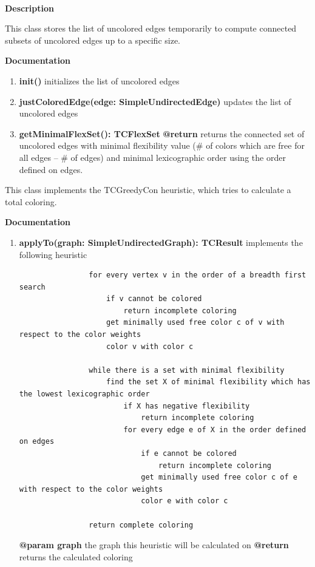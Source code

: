 	~\newpage
	
	
	\textbf{Description}
	
	This class stores the list of uncolored edges temporarily to compute connected subsets of uncolored edges up to a specific size.
		
	\textbf{Documentation}
	
	\begin{enumerate}[\#]
		\item{
			\textbf{init()} \newline
			initializes the list of uncolored edges
		}
		\item{
			\textbf{justColoredEdge(edge: SimpleUndirectedEdge)} \newline
			updates the list of uncolored edges
		}
		\item{
			\textbf{getMinimalFlexSet(): TCFlexSet} \newline
			\textbf{@return} returns the connected set of uncolored edges with minimal flexibility value (\# of colors which are free for all edges -- \# of edges) and minimal lexicographic order using the order defined on edges.
		}
	\end{enumerate}
	
	
	This class implements the TCGreedyCon heuristic, which tries to calculate a total coloring.
	
	\textbf{Documentation}
	
	\begin{enumerate}[+]
		\item{
			\textbf{applyTo(graph: SimpleUndirectedGraph): TCResult} \newline
			implements the following heuristic
			
			\begin{verbatim}
				for every vertex v in the order of a breadth first search
				    if v cannot be colored
				        return incomplete coloring
				    get minimally used free color c of v with respect to the color weights
				    color v with color c
				    
				while there is a set with minimal flexibility
				    find the set X of minimal flexibility which has the lowest lexicographic order
				        if X has negative flexibility
				            return incomplete coloring
				        for every edge e of X in the order defined on edges
				            if e cannot be colored
				                return incomplete coloring
				            get minimally used free color c of e with respect to the color weights
				            color e with color c
				        
				return complete coloring
			\end{verbatim}
			
			\textbf{@param graph} the graph this heuristic will be calculated on \newline
			\textbf{@return} returns the calculated coloring
		}
	\end{enumerate}
	
